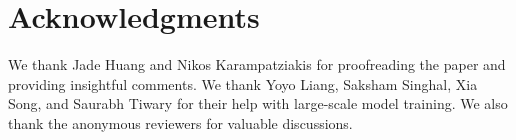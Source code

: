 \section{Acknowledgments}

We thank Jade Huang and Nikos Karampatziakis for proofreading the paper and providing insightful comments. We thank Yoyo Liang, Saksham Singhal, Xia Song, and Saurabh Tiwary for their help with large-scale model training. 
We also thank the anonymous reviewers for valuable discussions.  


